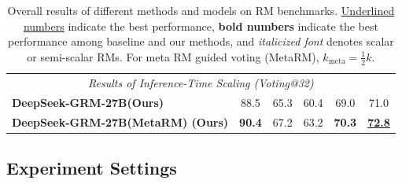 \documentclass{article} %
\newcommand{\SGRM}{DeepSeek-GRM-27B\xspace}
\begin{document}
\begin{table}[t]
{\begin{tabular}{lccccc}
  \midrule
  \multicolumn{6}{c}{\textit{Results of Inference-Time Scaling (Voting@32)}} \\
  \textbf{\SGRM (Ours)} & 88.5 & 65.3 & 60.4 & 69.0 & 71.0 \\
  \textbf{\SGRM (MetaRM) (Ours)} & \textbf{90.4} & 67.2 & 63.2 & \textbf{70.3} & \uline{\textbf{72.8}} \\
  \bottomrule
  \end{tabular}
  }
  \caption{Overall results of different methods and models on RM benchmarks. \uline{Underlined numbers} indicate the best performance, \textbf{bold numbers} indicate the best performance among baseline and our methods, and \textit{italicized font} denotes scalar or semi-scalar RMs. For meta RM guided voting (MetaRM), $k_{\mathrm{meta}} = \frac{1}{2}k$.}
  \label{tab:main-results}
  \vspace{-1em}
\end{table}

\vspace{-0.5em}
\subsection{Experiment Settings}

\end{document}
